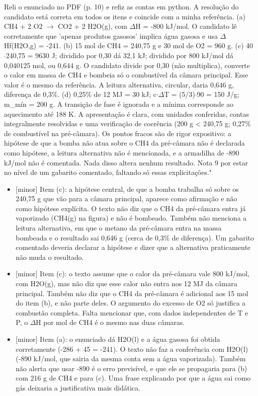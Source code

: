\documentclass{article}%
\begin{document}
Reli o enunciado no PDF (p. 10) e refiz as contas em python. A resolução do candidato está correta em todos os itens e coincide com a minha referência. (a) CH4 + 2 O2 $\to$ CO2 + 2 H2O(g), com $\Delta$H = -800 kJ/mol. O candidato lê corretamente que 'apenas produtos gasosos' implica água gasosa e usa $\Delta$Hf(H2O,g) = -241. (b) 15 mol de CH4 = 240,75 g e 30 mol de O2 = 960 g. (c) 40$\cdot$240,75 = 9630 J; dividido por 0,30 dá 32,1 kJ; dividido por 800 kJ/mol dá 0,040125 mol, ou 0,644 g. O candidato divide por 0,30 (não multiplica), converte o calor em massa de CH4 e bombeia só o combustível da câmara principal. Esse valor é o mesmo da referência. A leitura alternativa, circular, daria 0,646 g, diferença de 0,3\%. (d) 0,25\% de 12 MJ = 30 kJ; c$\cdot$$\Delta$T = (5/3)$\cdot$90 = 150 J/g; m\_mín = 200 g. A transição de fase é ignorada e a mínima corresponde ao aquecimento até 188 K. A apresentação é clara, com unidades conferidas, contas integralmente resolvidas e uma verificação de coerência (200 g < 240,75 g; 0,27\% de combustível na pré{-}câmara). Os pontos fracos são de rigor expositivo: a hipótese de que a bomba não atua sobre o CH4 da pré{-}câmara não é declarada como hipótese, a leitura alternativa não é mencionada, e a armadilha de -890 kJ/mol não é comentada. Nada disso altera nenhum resultado. Nota 9 por estar no nível de um gabarito comentado, faltando só essas explicitações."%
\begin{itemize}%
\item%
{[}minor{]} Item (c): a hipótese central, de que a bomba trabalha só sobre os 240,75 g que vão para a câmara principal, aparece como afirmação e não como hipótese explícita. O texto não diz que o CH4 da pré{-}câmara entra já vaporizado (CH4(g) na figura) e não é bombeado. Também não menciona a leitura alternativa, em que o metano da pré{-}câmara entra na massa bombeada e o resultado sai 0,646 g (cerca de 0,3\% de diferença). Um gabarito comentado deveria declarar a hipótese e dizer que a alternativa praticamente não muda o resultado.%
\item%
{[}minor{]} Item (c): o texto assume que o calor da pré{-}câmara vale 800 kJ/mol, com H2O(g), mas não diz que esse calor não entra nos 12 MJ da câmara principal. Também não diz que o CH4 da pré{-}câmara é adicional aos 15 mol do item (b), e não parte deles. O argumento do excesso de O2 só justifica a combustão completa. Falta mencionar que, com dados independentes de T e P, o $\Delta$H por mol de CH4 é o mesmo nas duas câmaras.%
\item%
{[}minor{]} Item (a): o enunciado dá H2O(l) e a água gasosa foi obtida corretamente (-286 + 45 = -241). O texto não faz a conferência com H2O(l) (-890 kJ/mol, que sairia da mesma conta sem a água vaporizada). Também não alerta que usar -890 é o erro previsível, e que ele se propagaria para (b) com 216 g de CH4 e para (c). Uma frase explicando por que a água sai como gás deixaria a justificativa mais didática.%

\end{itemize}$$
\end{document}
